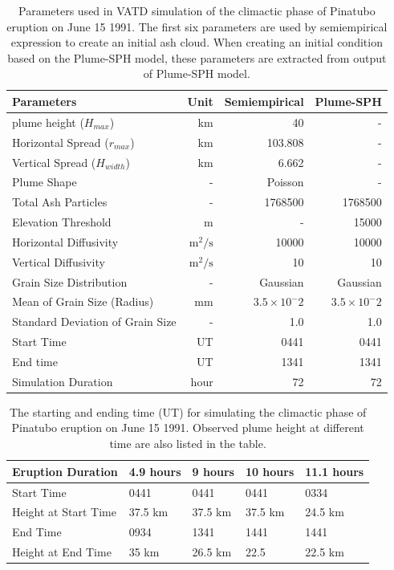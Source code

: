 \documentclass[utf8]{frontiersSCNS} %
\begin{document}
\begin{table}[htp]
\centering
\caption{Parameters used in VATD simulation of the climactic phase of Pinatubo eruption on June 15 1991. The first six parameters are used by semiempirical expression to create an initial ash cloud. When creating an initial condition based on the Plume-SPH model, these parameters are extracted from output of Plume-SPH model.}
	 \begin{tabular}{lrrr}
	 \hline
	 Parameters & Unit & Semiempirical & Plume-SPH \\
	 \hline
	 plume height ($H_{max}$) & km & 40 & - \\ %
	 Horizontal Spread ($r_{max}$) & km & 103.808 & -\\
	 Vertical Spread ($H_{width}$) & km & 6.662 & - \\
	 Plume Shape & - & Poisson & - \\
	 Total Ash Particles & - & 1768500 & 1768500 \\
	 Elevation Threshold & m & - & 15000 \\
	 Horizontal Diffusivity & $\mathrm{m}^2/\mathrm{s}$ &10000 & 10000\\
	 Vertical Diffusivity & $\mathrm{m}^2/\mathrm{s}$ & 10 & 10 \\
	 Grain Size Distribution & - & Gaussian & Gaussian \\
	 Mean of Grain Size (Radius) & mm & $3.5 \times 10 ^-2$ & $3.5 \times 10 ^-2$ \\
	 Standard Deviation of Grain Size & - & 1.0 & 1.0 \\
	 	Start Time & UT & 0441 & 0441 \\
	 End time & UT & 1341 & 1341 \\
	 Simulation Duration & hour & 72 & 72 \\
	 \hline
	 \end{tabular}
	 \label{tab:input_parameter_Puff_simulation}
\end{table}

\begin{table}[htp]
\centering
\caption{The starting and ending time (UT) for simulating the climactic phase of Pinatubo eruption on June 15 1991. Observed plume height \citep{holasek1996satellite} at different time are also listed in the table.}		
	 \begin{tabular}{p{35mm}p{20mm}p{20mm}p{20mm}p{20mm}}
	 \hline
Eruption Duration & 4.9 hours & 9 hours & 10 hours & 11.1 hours \\
	 \hline
	 Start Time & 0441 & 0441 & 0441 & 0334 \\
	 Height at Start Time & 37.5 km & 37.5 km & 37.5 km & 24.5 km \\
	
	 End Time & 0934 & 1341 & 1441 & 1441 \\
	 Height at End Time & 35 km & 26.5 km & 22.5 & 22.5 km \\
	 \hline
	 \end{tabular}
	 \label{tab:Pinatubo-eruption-duration}
\end{table}
\end{document}
